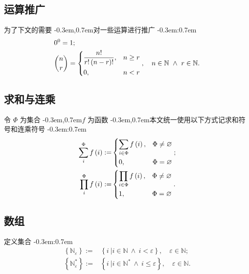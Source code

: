 \documentclass{article}
\newcommand\BrSetN[1]{\Set{\MathPartialSetN{#1}}}
\newcommand\BrSetU[1]{\Set{\MathPartialSetU{#1}}}
\newcommand\InSetN[1]{\InSet{#1}{\MathSetN}}
\newcommand\InSetU[1]{\InSet{#1}{\MathSetU}}
\newcommand\MathPartialSetN[1]{\mathbb{N}_{#1}}
\newcommand\MathPartialSetU[1]{\mathbb{N}^{*}_{#1}}
\newcommand\MathSetN{\mathbb{N}}
\newcommand\MathSetU{\mathbb{N}^{*}}
\newcommand\Bracket[1]{\left( #1 \right)}
\newcommand\BracketBig[1]{\left\{ #1 \right\}}
\newcommand\CaseDomain[1]{\DomainComma & #1}
\newcommand\Colon{:}
\newcommand\Comma{,}
\newcommand\DefineAs{:=}
\newcommand\Domain[1]{\DomainComma \quad #1}
\newcommand\DomainAnd{\LogicAnd}
\newcommand\DomainComma{\Comma}
\newcommand\EmptySet{\varnothing}
\newcommand\Func[2]{#1 \Bracket{#2}}
\newcommand\InSet[2]{#1 \in #2}
\newcommand\Logic[1]{\ #1\ }
\newcommand\LogicAnd{\Logic{\wedge}}
\newcommand\Prod[3]{\prod_{#1}^{#2} #3}
\newcommand\Set[1]{\BracketBig{#1}}
\newcommand\SetDefAnd{\LogicAnd}
\newcommand\SetDefinition[2]{\Set{\left. #1 \ \right| #2}}
\newcommand\Sum[3]{\sum_{#1}^{#2} #3}
\newcommand\EqEndPeriod{.}
\newcommand\EqEndSemicolon{;}
\newcommand\TextColon{\TextPunctuation{\Colon}}
\newcommand\TextComma{\TextPunctuation{\Comma}}
\newcommand\TextPunctuation[1]{\kern -0.3em#1\kern 0.7em}
\begin{document}
	\subsection{运算推广} \label{sec:2.1}
	为了下文的需要 \TextComma 对一些运算进行推广 \TextColon
	\begin{align*}
	& 0^{0} = 1 \EqEndSemicolon \\
	& \binom{n}{r} =
	\begin{dcases}
	\frac{n!}{r!\Bracket{n-r}!} \CaseDomain{n \geq r} \\
	0 \CaseDomain{n < r}
	\end{dcases} \Domain{\InSetN{n} \DomainAnd \InSetN{r}} \EqEndPeriod
	\end{align*}
	
	
	\subsection{求和与连乘} \label{sec:2.2}
	令 $\Phi$ 为集合 \TextComma $f$ 为函数 \TextComma 本文统一使用以下方式记求和符号和连乘符号 \TextColon
	\begin{align*}
	\Sum{i}{\Phi}{\Func{f}{i}} \DefineAs &
	\begin{dcases}
	\sum_{\InSet{i}{\Phi}} \Func{f}{i} \CaseDomain{\Phi \neq \EmptySet} \\
	0 \CaseDomain{\Phi = \EmptySet}
	\end{dcases} \EqEndSemicolon \\
	\Prod{i}{\Phi}{\Func{f}{i}} \DefineAs &
	\begin{dcases}
	\prod_{\InSet{i}{\Phi}} \Func{f}{i} \CaseDomain{\Phi \neq \EmptySet} \\
	1 \CaseDomain{\Phi = \EmptySet}
	\end{dcases} \EqEndPeriod
	\end{align*}
	
	
	\subsection{数组} \label{sec:2.3}
	定义集合 \TextColon
	\begin{align*}
	\BrSetN{\varepsilon} \DefineAs & \SetDefinition{i}{\InSetN{i} \SetDefAnd i < \varepsilon} \Domain{\InSetN{\varepsilon}} \EqEndSemicolon \\
	\BrSetU{\varepsilon} \DefineAs & \SetDefinition{i}{\InSetU{i} \SetDefAnd i \leq \varepsilon} \Domain{\InSetN{\varepsilon}} \EqEndPeriod
	\end{align*}
	
\end{document}
